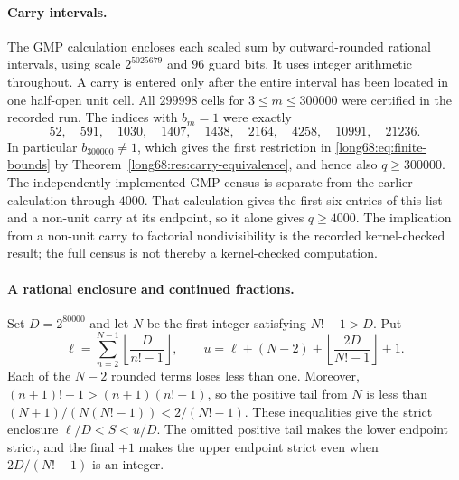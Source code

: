 \paragraph{Carry intervals.}
The GMP calculation encloses each scaled sum by outward-rounded rational
intervals, using scale $2^{5025679}$ and $96$ guard bits. It uses integer
arithmetic throughout. A carry is entered only after the entire interval
has been located in one half-open unit cell. All $299998$ cells for
$3\le m\le300000$ were certified in the recorded run. The indices with
$b_m=1$ were exactly
\[
52,\quad591,\quad1030,\quad1407,\quad1438,\quad2164,\quad4258,
\quad10991,\quad21236.
\]
In particular $b_{300000}\ne1$, which gives the first restriction in
\eqref{long68:eq:finite-bounds} by
Theorem~\ref{long68:res:carry-equivalence}, and hence also $q\ge300000$.
The independently implemented GMP census is separate from the earlier
calculation through $4000$. That calculation gives the first six entries
of this list and a non-unit carry at its endpoint, so it alone gives
$q\ge4000$. The implication from a non-unit carry to factorial
nondivisibility is the recorded kernel-checked result; the full census
is not thereby a kernel-checked computation.

\paragraph{A rational enclosure and continued fractions.}
Set $D=2^{80000}$ and let $N$ be the first integer satisfying $N!-1>D$.
Put
\[
 \ell=\sum_{n=2}^{N-1}\left\lfloor\frac D{n!-1}\right\rfloor,
 \qquad
 u=\ell+(N-2)+\left\lfloor\frac{2D}{N!-1}\right\rfloor+1.
\]
Each of the $N-2$ rounded terms loses less than one. Moreover,
$(n+1)!-1>(n+1)(n!-1)$, so the positive tail from $N$ is less than
$(N+1)/(N(N!-1))<2/(N!-1)$. These inequalities give the strict enclosure
$\ell/D<S<u/D$. The omitted positive tail makes the lower endpoint strict,
and the final $+1$ makes the upper endpoint strict even when
$2D/(N!-1)$ is an integer.

